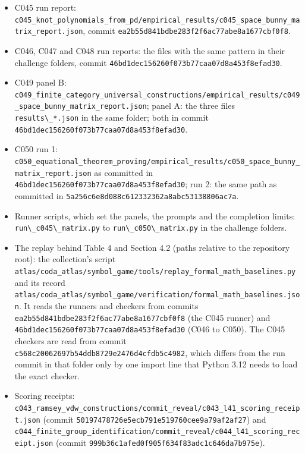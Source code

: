 \documentclass[
  11pt,
]{article}
\newcommand{\passthrough}[1]{#1}
\providecommand{\tightlist}{%
  \setlength{\itemsep}{0pt}\setlength{\parskip}{0pt}}
\begin{document}
\begin{itemize}
\tightlist
\item
  C045 run report:
  \nolinkurl{c045_knot_polynomials_from_pd/empirical_results/c045_space_bunny_matrix_report.json},
  commit \nolinkurl{ea2b55d841bdbe283f2f6ac77abe8a1677cbf0f8}.
\item
  C046, C047 and C048 run reports: the files with the same pattern in
  their challenge folders, commit
  \nolinkurl{46bd1dec156260f073b77caa07d8a453f8efad30}.
\item
  C049 panel B:
  \nolinkurl{c049_finite_category_universal_constructions/empirical_results/c049_space_bunny_matrix_report.json};
  panel A: the three files \passthrough{\lstinline!results\_*.json!} in
  the same folder; both in commit
  \nolinkurl{46bd1dec156260f073b77caa07d8a453f8efad30}.
\item
  C050 run 1:
  \nolinkurl{c050_equational_theorem_proving/empirical_results/c050_space_bunny_matrix_report.json}
  as committed in \nolinkurl{46bd1dec156260f073b77caa07d8a453f8efad30};
  run 2: the same path as committed in
  \nolinkurl{5a256c6e8d088c612332362a8abc53138806ac7a}.
\item
  Runner scripts, which set the panels, the prompts and the completion
  limits: \passthrough{\lstinline!run\_c045\_matrix.py!} to
  \passthrough{\lstinline!run\_c050\_matrix.py!} in the challenge
  folders.
\item
  The replay behind Table 4 and Section 4.2 (paths relative to the
  repository root): the collection's script
  \nolinkurl{atlas/coda_atlas/symbol_game/tools/replay_formal_math_baselines.py}
  and its record
  \nolinkurl{atlas/coda_atlas/symbol_game/verification/formal_math_baselines.json}.
  It reads the runners and checkers from commits
  \nolinkurl{ea2b55d841bdbe283f2f6ac77abe8a1677cbf0f8} (the C045 runner)
  and \nolinkurl{46bd1dec156260f073b77caa07d8a453f8efad30} (C046 to
  C050). The C045 checkers are read from commit
  \nolinkurl{c568c20062697b54ddb8729e2476d4cfdb5c4982}, which differs
  from the run commit in that folder only by one import line that Python
  3.12 needs to load the exact checker.
\item
  Scoring receipts:
  \nolinkurl{c043_ramsey_vdw_constructions/commit_reveal/c043_l41_scoring_receipt.json}
  (commit \nolinkurl{50197478726e5ecb791e519760cee9a79af2af27}) and
  \nolinkurl{c044_finite_group_identification/commit_reveal/c044_l41_scoring_receipt.json}
  (commit \nolinkurl{999b36c1afed0f905f634f83adc1c646da7b975e}).
\end{itemize}
\end{document}
